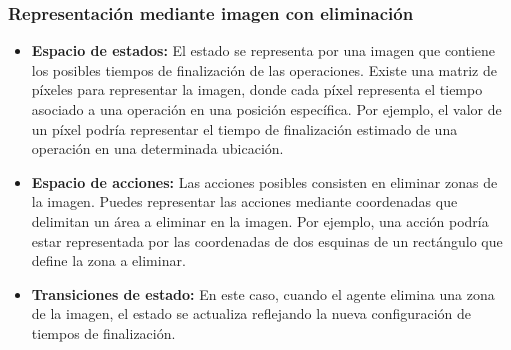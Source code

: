 \subsubsection{Representación mediante imagen con eliminación}
\begin{itemize}
    \item \textbf{Espacio de estados:} El estado se representa por una imagen que contiene 
    los posibles tiempos de finalización de las operaciones. Existe una matriz de píxeles 
    para representar la imagen, donde cada píxel representa el tiempo asociado a una operación 
    en una posición específica. Por ejemplo, el valor de un píxel podría representar el tiempo 
    de finalización estimado de una operación en una determinada ubicación.
    \item \textbf{Espacio de acciones:} Las acciones posibles consisten en eliminar zonas de 
    la imagen. Puedes representar las acciones mediante coordenadas que delimitan un área a 
    eliminar en la imagen. Por ejemplo, una acción podría estar representada por las 
    coordenadas de dos esquinas de un rectángulo que define la zona a eliminar.
    \item \textbf{Transiciones de estado:} En este caso, cuando el agente elimina una zona de 
    la imagen, el estado se actualiza reflejando la nueva configuración de tiempos de finalización. 
\end{itemize}
